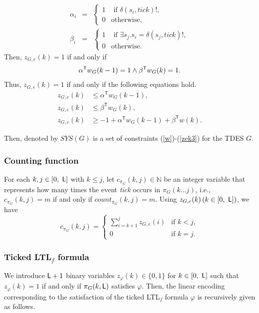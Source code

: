\documentclass[journal,twoside,web]{IEEEtran}
\newcommand{\Len}{{\sf L}}
\begin{document}
\begin{eqnarray*}
\alpha_{i}&=&\left\{ \begin{array}{ll}
1 & \mbox{ if } \delta(s_i, tick)!, \\
0 & \mbox{otherwise,}
\end{array} \right.\\
\beta_{i}&=&\left\{ \begin{array}{ll}
1 & \mbox{ if } \exists s_j. s_i=\delta(s_j,tick)!, \\
0 & \mbox{otherwise.}
\end{array} \right.
\end{eqnarray*}
Then, $z_{G,e}(k)=1$ if and only if
\begin{align}%
\alpha^\mathsf{T} w_G (k-1) = 1 \wedge \beta^\mathsf{T} w_G (k) =1. \notag 
\end{align}
Thus, $z_{G,e}(k)=1$ if and only if the following equations hold.
\begin{align}
z_{G,e} (k) &\leq \alpha^\mathsf{T} w_G (k-1),\label{zek1} \\
z_{G,e} (k) &\leq \beta^\mathsf{T} w_G (k), \label{zek2}  \\
z_{G,e} (k) & \geq -1 + \alpha^\mathsf{T} w_G (k-1) + \beta^\mathsf{T} w (k).\label{zek3}
\end{align}

Then, denoted by $SYS(G)$ is a set of constraints (\ref{w})-(\ref{zek3}) for the TDES $G$.


\subsubsection{Counting function}
For each $k, j \in [0,\ \Len]$ with $k\leq j$, let $c_{\pi_G} (k, j) \in \mathbb{N}$ be an integer variable that represents how many times the event \textit{tick} occurs in $\pi_G(k...j)$, i.e., $c_{\pi_G}(k,j) = m$ if and only if $count_{\pi_G}(k,j) = m$. 
Using $z_{G,e} (k)\, (k \in [0,\ \Len])$, we have
\begin{equation}\label{ckj}
c_{\pi_G} (k, j) = \left\{ \begin{array}{ll}
\displaystyle{\sum^j _{i = k+1} z_{G,e} (i)} & \mbox{if } k<j , \\
0 & \mbox{if } k=j.
\end{array} \right. 
\end{equation}



%
\subsubsection{Ticked LTL$_f$ formula}\label{encLTL}
%   
We introduce $\Len+1$ binary variables $z_{\varphi}(k) \in \{0,1\}$ for $k \in [0,\ \Len]$ such that $z_{\varphi}(k)=1$ if and only if $\pi_G (k, \Len)$ satisfies $\varphi$.
Then, the linear encoding corresponding to the satisfaction of  the ticked LTL$_f$ formula $\varphi$ is recursively given as follows.
%
%
\end{document}
